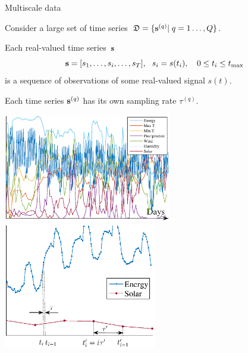 \documentclass{beamer}
\begin{document}
\begin{frame}{Multiscale data}

Consider a large set of time series~${\mathfrak{D}}=\{{\mathbf{s}}^{(q)}| \; q = 1\dots, {Q}\}$.

\smallskip
Each real-valued time series~${\mathbf{s}}$ \[ {\mathbf{s}} = [s_1, \dots, s_i, \dots, s_{T}], ~~ s_i = s(t_i),\quad 0 \leq t_i \leq t_{\max}\]
is a sequence of observations  of some real-valued signal $s(t)$.


\smallskip
Each time series ${\mathbf{s}}^{(q)}$ has its own sampling rate $\tau^{(q)}$.

\includegraphics[width=0.55\textwidth]{data_example_100days.eps}
\includegraphics[width=0.5\textwidth]{data_sampling_100days.eps}

\end{frame}
\end{document}
